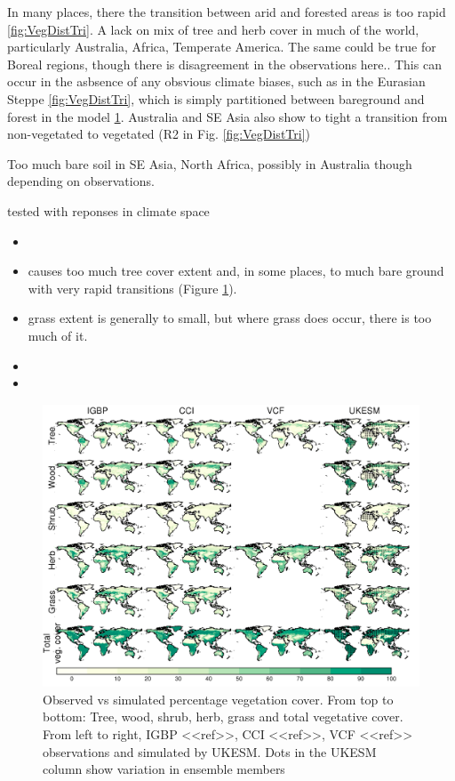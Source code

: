 In many places, there the transition between arid and forested areas is too rapid \ref{fig:VegDistTri}. A lack on mix of tree and herb cover in much of the world, particularly Australia, Africa, Temperate America. The same could be true for Boreal regions, though there is disagreement in the observations here.. This can occur in the asbsence of any obsvious climate biases, such as in the Eurasian Steppe \ref{fig:VegDistTri}, which is simply partitioned between bareground and forest in the model \ref{fig:VegDistMap}. Australia and SE Asia also show to tight a transition from non-vegetated to vegetated (R2 in Fig. \ref{fig:VegDistTri})

 Too much bare soil in SE Asia, North Africa, possibly in Australia though depending on observations. 


tested with reponses in climate space

\begin{itemize}
    \item 
    \item causes too much tree cover extent and, in some places, to much bare ground with very rapid transitions (Figure  \ref{fig:VegDistMap}).
    \item grass extent is generally to small, but where grass does occur, there is too much of it.
    \item 
    \item 
\end{itemize}


\begin{figure}[t]
\includegraphics[width=12cm]{figs/VegDist/vegDist.png}
\caption{Observed vs simulated percentage vegetation cover. From top to bottom: Tree, wood, shrub, herb, grass and total vegetative cover. From left to right, IGBP <<ref>>, CCI <<ref>>, VCF <<ref>> observations and simulated by UKESM. Dots in the UKESM column show variation in ensemble members \label{fig:VegDistMap}}
\end{figure}


